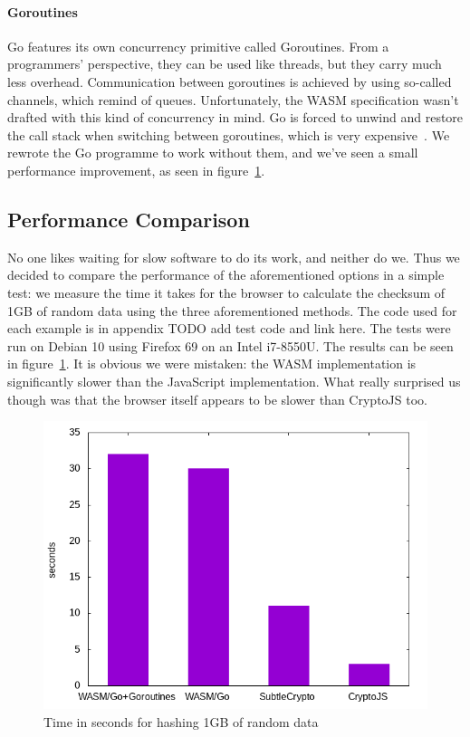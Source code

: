 \paragraph{Goroutines} Go features its own concurrency primitive called Goroutines.
From a programmers' perspective, they can be used like threads, but they carry much less overhead.
Communication between goroutines is achieved by using so-called channels, which remind of queues.
Unfortunately, the \gls{WASM} specification wasn't drafted with this kind of concurrency in mind.
Go is forced to unwind and restore the call stack when switching between goroutines, which is very expensive~\cite{lolnogoroutines}.
We rewrote the Go programme to work without them, and we've seen a small performance improvement, as seen in figure~\ref{fig:hashingperformance}.





\subsection{Performance Comparison}
\label{subsec:perfcomphashing}
No one likes waiting for slow software to do its work, and neither do we.
Thus we decided to compare the performance of the aforementioned options in a simple test:
we measure the time it takes for the browser to calculate the checksum of 1GB of random data using the three aforementioned methods.
The code used for each example is in appendix TODO add test code and link here.
The tests were run on Debian 10 using Firefox 69 on an Intel i7-8550U.
The results can be seen in figure~\ref{fig:hashingperformance}.
It is obvious we were mistaken: the WASM implementation is significantly slower than the JavaScript implementation.
What really surprised us though was that the browser itself appears to be slower than CryptoJS too.

\begin{figure}
    \begin{center}
        \includegraphics[width=0.7\linewidth]{images/hashingperformance.png}
        \caption{Time in seconds for hashing 1GB of random data}
        \label{fig:hashingperformance}
    \end{center}
\end{figure}


